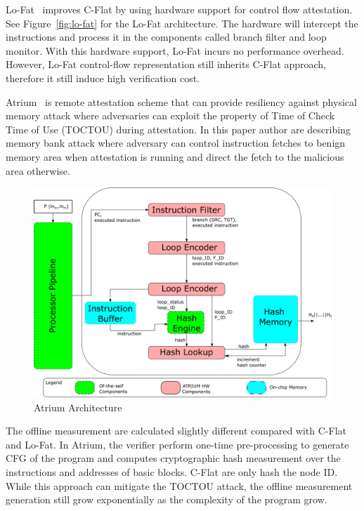 Lo-Fat~\cite{dessoukyLOFATLowOverheadControl2017} improves C-Flat by using
hardware support for control flow attestation. See Figure~\ref{fig:lo-fat} for
the Lo-Fat architecture. The hardware will intercept the instructions and
process it in the components called branch filter and loop monitor. With this
hardware support, Lo-Fat incurs no performance overhead. However, Lo-Fat
control-flow representation still inherits C-Flat approach, therefore it still
induce high verification cost.

Atrium~\cite{zeitouniATRIUMRuntimeAttestation2017} is remote attestation scheme
that can provide resiliency against physical memory attack where adversaries can
exploit the property of Time of Check Time of Use (TOCTOU) during attestation.
In this paper author are describing memory bank attack where adversary can
control instruction fetches to benign memory area when attestation is running
and direct the fetch to the malicious area otherwise.

\begin{figure}[htbp]
\centerline{\includegraphics[scale=0.5]{Figures/01/atrium-overview.png}}
\caption{Atrium Architecture}
\label{fig:atrium}
\end{figure}

The offline measurement are calculated slightly different compared with C-Flat
and Lo-Fat. In Atrium, the verifier perform one-time pre-processing to generate
CFG of the program and computes cryptographic hash measurement over the
instructions and addresses of basic blocks. C-Flat are only hash the node ID.
While this approach can mitigate the TOCTOU attack, the offline measurement
generation still grow exponentially as the complexity of the program grow. 


